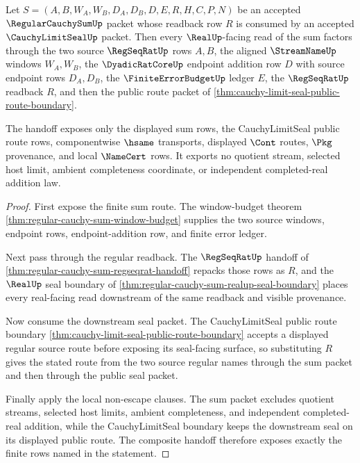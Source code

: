\begin{theorem}
\label{thm:regular-cauchy-sum-cauchy-limit-seal-handoff}
Let $S=(A,B,W_A,W_B,D_A,D_B,D,E,R,H,C,P,N)$ be an accepted $\RegularCauchySumUp$ packet whose readback row $R$ is consumed by an accepted $\CauchyLimitSealUp$ packet. Then every $\RealUp$-facing read of the sum factors through the two source $\RegSeqRatUp$ rows $A,B$, the aligned $\StreamNameUp$ windows $W_A,W_B$, the $\DyadicRatCoreUp$ endpoint addition row $D$ with source endpoint rows $D_A,D_B$, the $\FiniteErrorBudgetUp$ ledger $E$, the $\RegSeqRatUp$ readback $R$, and then the public route packet of \autoref{thm:cauchy-limit-seal-public-route-boundary}.

The handoff exposes only the displayed sum rows, the CauchyLimitSeal public route rows, componentwise $\hsame$ transports, displayed $\Cont$ routes, $\Pkg$ provenance, and local $\NameCert$ rows. It exports no quotient stream, selected host limit, ambient completeness coordinate, or independent completed-real addition law.
\end{theorem}
\begin{proof}
First expose the finite sum route. The window-budget theorem \autoref{thm:regular-cauchy-sum-window-budget} supplies the two source windows, endpoint rows, endpoint-addition row, and finite error ledger.

Next pass through the regular readback. The $\RegSeqRatUp$ handoff of \autoref{thm:regular-cauchy-sum-regseqrat-handoff} repacks those rows as $R$, and the $\RealUp$ seal boundary of \autoref{thm:regular-cauchy-sum-realup-seal-boundary} places every real-facing read downstream of the same readback and visible provenance.

Now consume the downstream seal packet. The CauchyLimitSeal public route boundary \autoref{thm:cauchy-limit-seal-public-route-boundary} accepts a displayed regular source route before exposing its seal-facing surface, so substituting $R$ gives the stated route from the two source regular names through the sum packet and then through the public seal packet.

Finally apply the local non-escape clauses. The sum packet excludes quotient streams, selected host limits, ambient completeness, and independent completed-real addition, while the CauchyLimitSeal boundary keeps the downstream seal on its displayed public route. The composite handoff therefore exposes exactly the finite rows named in the statement.
\end{proof}

